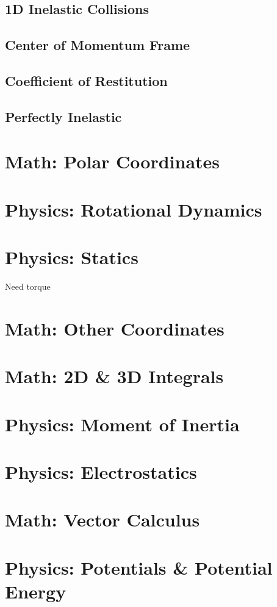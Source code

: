 \documentclass{article}
\begin{document}
\subsection{1D Inelastic Collisions}
\subsection{Center of Momentum Frame}
\subsection{Coefficient of Restitution}
\subsection{Perfectly Inelastic}

\section{Math: Polar Coordinates}
\section{Physics: Rotational Dynamics}
\section{Physics: Statics}
Need torque
\section{Math: Other Coordinates}
\section{Math: 2D \& 3D Integrals}
\section{Physics: Moment of Inertia}
\section{Physics: Electrostatics}

\section{Math: Vector Calculus}
\section{Physics: Potentials \& Potential Energy}
\end{document}
